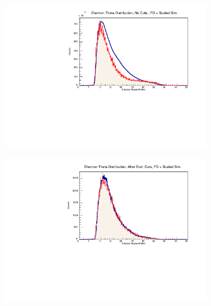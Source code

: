         \begin{figure}
            \centering
            \begin{subfigure}{.45\textwidth}
                \centering
                \includegraphics[width=1\textwidth]{figures/Simulation/kinematics_basic/hist_electron_theta_nocut_fd_Double.pdf}
            \end{subfigure}%
            \begin{subfigure}{.45\textwidth}
                \centering
                \includegraphics[width=1\textwidth]{figures/Simulation/kinematics_basic/hist_electron_theta_excut_fd_Double.pdf}
            \end{subfigure}
            \begin{subfigure}{.45\textwidth}
                \centering

\end{subfigure}
\end{figure}
